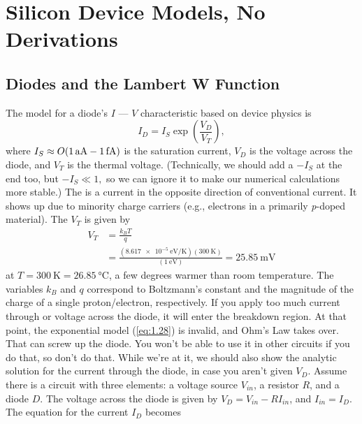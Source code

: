 \section{Silicon Device Models, No Derivations}
\subsection{Diodes and the Lambert W Function}
The model for a diode's $I$ --- $V$ characteristic  based on device physics is
\begin{equation}
\label{eq:1.28}
I_{D} = I_{S} \exp \left( \frac{V_{D}}{V_{T}} \right),
\end{equation}
where $I_{S} \approx O(\SI{1}{aA} \-- \SI{1}{fA})$ is the saturation current, $V_{D}$ is the voltage across the diode, and $V_{T}$ is the thermal voltage. (Technically, we should add a $-I_{S}$ at the end too, but $-I_{S} \ll 1,$ so we can ignore it to make our numerical calculations more stable.) The  is a current in the opposite direction of conventional current. It shows up due to minority charge carriers (e.g., electrons in a primarily \textit{p}-doped material). The  $V_{T}$ is given by
\begin{equation}
  \begin{aligned}
\label{eq:1.29}
V_{T} &= \frac{k_{B} T}{q} \\ &= \frac{\left( \SI{8.617e-5}{\electronvolt \per \kelvin} \right) \left( \SI{300}{\kelvin} \right) }{ \left( \SI{1}{\electronvolt} \right) } = \SI{25.85}{\milli \volt}
\end{aligned}
\end{equation}
at $T = \SI{300}{\kelvin} = \SI{26.85}{\celsius}$, a few degrees warmer than room temperature. The variables $k_{B}$ and $q$ correspond to Boltzmann's constant and the magnitude of the charge of a single proton/electron, respectively. If you apply too much current through or voltage across the diode, it will enter the breakdown region. At that point, the exponential model (\cref{eq:1.28}) is invalid, and Ohm's Law takes over. That can screw up the diode. You won't be able to use it in other circuits if you do that, so don't do that.
While we're at it, we should also show the analytic solution for the current through the diode, in case you aren't given $V_{D}$. Assume there is a circuit with three elements: a voltage source $V_{in}$, a resistor $R$, and a diode $D$. The voltage across the diode is given by $V_{D} = V_{in} - R I_{in}$, and $I_{in} = I_{D}$. The equation for the current $I_{D}$ becomes
